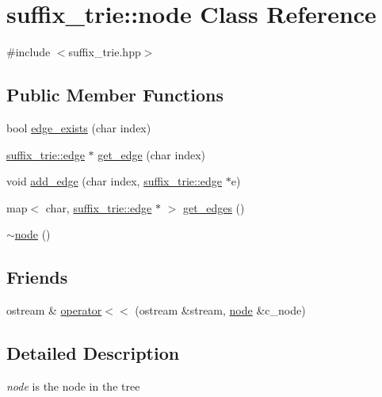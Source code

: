 \hypertarget{classsuffix__trie_1_1node}{\section{suffix\+\_\+trie\+:\+:node Class Reference}
\label{classsuffix__trie_1_1node}
}


{\ttfamily \#include $<$suffix\+\_\+trie.\+hpp$>$}

\subsection*{Public Member Functions}
\begin{DoxyCompactItemize}
\item 
bool \hyperlink{classsuffix__trie_1_1node_a480aaa8ea25e04ac11a8dd470a957265}{edge\+\_\+exists} (char index)
\item 
\hyperlink{classsuffix__trie_1_1edge}{suffix\+\_\+trie\+::edge} $\ast$ \hyperlink{classsuffix__trie_1_1node_ac4e1886521e0e4140aae9556bdaa5631}{get\+\_\+edge} (char index)
\item 
void \hyperlink{classsuffix__trie_1_1node_adfb2fe365b990b61a1b91db8f5d3749a}{add\+\_\+edge} (char index, \hyperlink{classsuffix__trie_1_1edge}{suffix\+\_\+trie\+::edge} $\ast$e)
\item 
map$<$ char, \hyperlink{classsuffix__trie_1_1edge}{suffix\+\_\+trie\+::edge} $\ast$ $>$ \hyperlink{classsuffix__trie_1_1node_a740a3d23a9fe2b31e3066393b22ed099}{get\+\_\+edges} ()
\item 
\hyperlink{classsuffix__trie_1_1node_a495615a4cd50f64bc2455d7a8e8d9cbe}{$\sim$node} ()
\end{DoxyCompactItemize}
\subsection*{Friends}
\begin{DoxyCompactItemize}
\item 
ostream \& \hyperlink{classsuffix__trie_1_1node_ac4586c42ed86200a853773383056f379}{operator$<$$<$} (ostream \&stream, \hyperlink{classsuffix__trie_1_1node}{node} \&c\+\_\+node)
\end{DoxyCompactItemize}


\subsection{Detailed Description}
{\itshape node} is the node in the tree 


